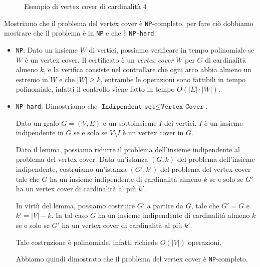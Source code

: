 \begin{figure}[H]
    \centering 
    \caption{Esempio di vertex cover di cardinalità $4$}
\end{figure}

Mostriamo che il problema del vertex cover è \texttt{NP}-completo, per fare ciò
dobbiamo mostrare che il problema è in \texttt{NP} e che è \texttt{NP-hard}.

\begin{itemize}
    \item \texttt{NP}: Dato un insieme $W$ di vertici, possiamo verificare in tempo polinomiale
    se $W$ è un vertex cover. Il certificato è un \textit{vertex cover} $W$ per $G$ di cardinalità
    almeno $k$, e la verifica consiste nel controllare che ogni arco abbia almeno un estremo in $W$
    e che $|W| \geq k$, entrambe le operazioni sono fattibili in tempo polinomiale, infatti il controllo
    viene fatto in tempo $O(|E| \cdot |W|)$.
    \item \texttt{NP-hard}: Dimostriamo che $\texttt{Indipendent set} \leq \texttt{Vertex Cover}$.

\begin{lemma}
    Dato un grafo $G = (V,E)$ e un sottoinsieme $I$ dei vertici, $I$ è un insieme indipendente
    in $G$ se e solo se $V \setminus I$ è un vertex cover in $G$.
\end{lemma}
    Dato il lemma, possiamo ridurre il problema dell'insieme indipendente al
    problema del vertex cover. Data un'istanza $(G, k)$ del problema dell'insieme indipendente,
    costruiamo un'istanza $(G', k')$ del problema del vertex cover tale che $G$ ha un insieme 
    indipendente di cardinalità almeno $k$ se e solo se $G'$ ha un vertex cover di cardinalità
    al più $k'$.

    In virtù del lemma, possiamo costruire $G'$ a partire da $G$, tale che $G' = G$ e $k' = |V| - k$.
    In tal caso $G$ ha un insieme indipendente di cardinalità almeno $k$ se e solo se $G'$ ha un
    vertex cover di cardinalità al più $k'$.

    Tale costruzione è polinomiale, infatti richiede $O(|V|)$ operazioni.

    Abbiamo quindi dimostrato che il problema del vertex cover è \texttt{NP}-completo.
\end{itemize}

